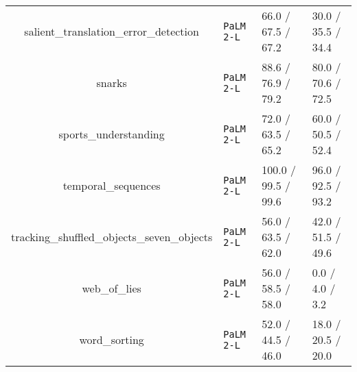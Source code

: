 \begin{table}[H]
\begin{center}
\begin{tabular}{cP{1.2cm}P{2.2cm}P{2.2cm}}
salient\_translation\_error\_detection & \texttt{PaLM 2-L} & 66.0 / 67.5 / 67.2 & 30.0 / 35.5 / 34.4 \\
snarks & \texttt{PaLM 2-L} & 88.6 / 76.9 / 79.2 & 80.0 / 70.6 / 72.5 \\
sports\_understanding & \texttt{PaLM 2-L} & 72.0 / 63.5 / 65.2 & 60.0 / 50.5 / 52.4 \\
temporal\_sequences & \texttt{PaLM 2-L} & 100.0 / 99.5 / 99.6 & 96.0 / 92.5 / 93.2 \\
tracking\_shuffled\_objects\_seven\_objects & \texttt{PaLM 2-L} & 56.0 / 63.5 / 62.0 & 42.0 / 51.5 / 49.6 \\
web\_of\_lies & \texttt{PaLM 2-L} & 56.0 / 58.5 / 58.0 & 0.0 / 4.0 / 3.2 \\
word\_sorting & \texttt{PaLM 2-L} & 52.0 / 44.5 / 46.0 & 18.0 / 20.5 / 20.0 \\
\bottomrule
\end{tabular}
\end{center}
\label{table:gpt_scores_on_bbh_tasks_starting_from_solve_the_problem}
\end{table}

